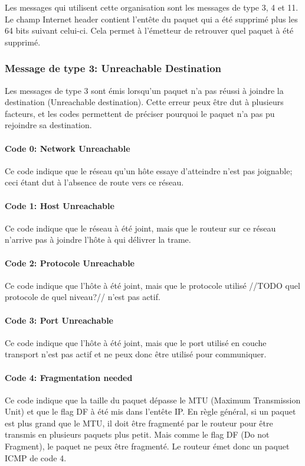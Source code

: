Les messages qui utilisent cette organisation sont les messages de type 3, 4
et 11.
Le champ Internet header contient l'entête du paquet qui a été supprimé plus
les 64 bits suivant celui-ci. Cela permet à l'émetteur de retrouver quel paquet
à été supprimé.


\subsubsection{Message de type 3: Unreachable Destination}
Les messages de type 3 sont émis lorsqu'un paquet n'a pas réussi à joindre la
destination (Unreachable destination). Cette erreur peux être dut à plusieurs
facteurs, et les codes permettent de préciser pourquoi le paquet n'a pas pu
rejoindre sa destination.

\paragraph{Code 0: Network Unreachable} Ce code indique que le réseau qu'un hôte essaye
d'atteindre n'est pas joignable; ceci étant dut à l'absence de route vers ce réseau.

\paragraph{Code 1: Host Unreachable} Ce code indique que le réseau à été joint, mais que
le routeur sur ce réseau n'arrive pas à joindre l'hôte à qui délivrer la trame.

\paragraph{Code 2: Protocole Unreachable} Ce code indique que l'hôte à été joint, mais
que le protocole utilisé //TODO quel protocole de quel niveau?// n'est pas actif.

\paragraph{Code 3: Port Unreachable} Ce code indique que l'hôte à été joint, mais que le
port utilisé en couche transport n'est pas actif et ne peux donc être utilisé pour
communiquer.

\paragraph{Code 4: Fragmentation needed} Ce code indique que la taille du paquet dépasse
le MTU (Maximum Transmission Unit) et que le flag DF à été mis dans l'entête IP.
En règle général, si un paquet est plus grand que le MTU, il doit être fragmenté par le
routeur pour être transmis en plusieurs paquets plus petit. Mais comme le flag DF (Do not
Fragment), le paquet ne peux être fragmenté. Le routeur émet donc un paquet ICMP de code 4.

